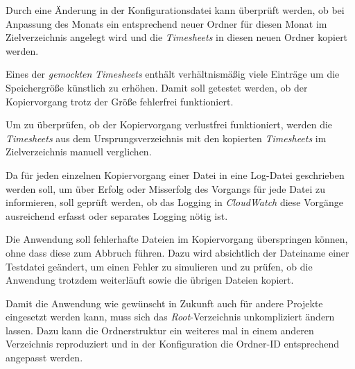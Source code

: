 Durch eine Änderung in der Konfigurationsdatei kann überprüft werden, ob bei Anpassung des Monats ein entsprechend neuer Ordner für diesen Monat im Zielverzeichnis angelegt wird und die \textit{\glspl{Timesheet}} in diesen neuen Ordner kopiert werden.

Eines der \textit{gemockten} \textit{\glspl{Timesheet}} enthält verhältnismäßig viele Einträge um die Speichergröße künstlich zu erhöhen. Damit soll getestet werden, ob der Kopiervorgang trotz der Größe fehlerfrei funktioniert.

Um zu überprüfen, ob der Kopiervorgang verlustfrei funktioniert, werden die \textit{\glspl{Timesheet}} aus dem Ursprungsverzeichnis mit den kopierten \textit{\glspl{Timesheet}} im Zielverzeichnis manuell verglichen.

Da für jeden einzelnen Kopiervorgang einer Datei in eine Log-Datei geschrieben werden soll, um über Erfolg oder Misserfolg des Vorgangs für jede Datei zu informieren, soll geprüft werden, ob das Logging in \textit{CloudWatch} diese Vorgänge ausreichend erfasst oder separates Logging nötig ist.

Die Anwendung soll fehlerhafte Dateien im Kopiervorgang überspringen können, ohne dass diese zum Abbruch führen. Dazu wird absichtlich der Dateiname einer Testdatei geändert, um einen Fehler zu simulieren und zu prüfen, ob die Anwendung trotzdem weiterläuft sowie die übrigen Dateien kopiert.

Damit die Anwendung wie gewünscht in Zukunft auch für andere Projekte eingesetzt werden kann, muss sich das \textit{Root}-Verzeichnis unkompliziert ändern lassen. Dazu kann die Ordnerstruktur ein weiteres mal in einem anderen Verzeichnis reproduziert und in der Konfiguration die Ordner-ID entsprechend angepasst werden.


\pagebreak

